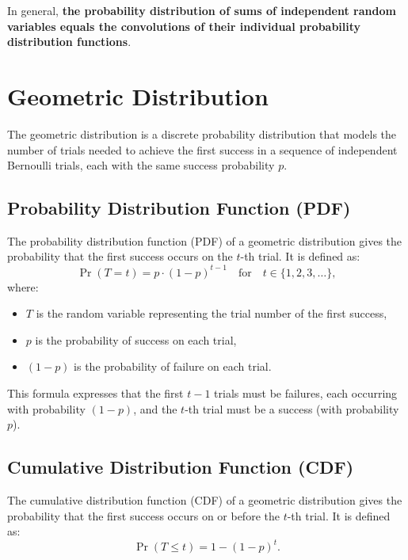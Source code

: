 \documentclass{masterthesis}
\begin{document}
In general, \textbf{the probability distribution of sums of independent random variables equals the convolutions of their individual probability distribution functions}.

\section*{Geometric Distribution}\label{section:geometric_distribution}

The geometric distribution is a discrete probability distribution that models the number of trials needed to achieve the first success in a sequence of independent Bernoulli trials, each with the same success probability $p$.

\subsection*{Probability Distribution Function (PDF)}\label{subsection:geometric_pdf}

The probability distribution function (PDF) of a geometric distribution gives the probability that the first success occurs on the $t$-th trial. It is defined as:
\begin{equation}
    \Pr(T = t) = p \cdot (1 - p)^{t-1} \quad \text{for} \quad t \in \{1, 2, 3, \ldots \},
\end{equation}
where:
\begin{itemize}
    \item $T$ is the random variable representing the trial number of the first success,
    \item $p$ is the probability of success on each trial,
    \item $(1 - p)$ is the probability of failure on each trial.
\end{itemize}

This formula expresses that the first $t-1$ trials must be failures, each occurring with probability $(1-p)$, and the $t$-th trial must be a success (with probability $p$).

\subsection*{Cumulative Distribution Function (CDF)}\label{subsection:geometric_cdf}

The cumulative distribution function (CDF) of a geometric distribution gives the probability that the first success occurs on or before the $t$-th trial. It is defined as:
\begin{equation}
    \Pr(T \leq t) = 1 - (1 - p)^t.
\end{equation}
\end{document}
